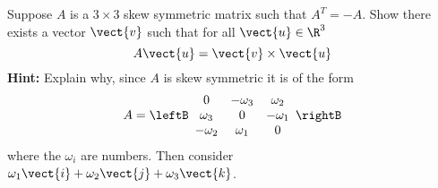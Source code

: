\begin{enumialphparenastyle}
\begin{ex} Suppose $A$ is a $3\times 3$ skew symmetric matrix such that $A^{T}=-A$. Show
there exists a vector $\vect{v}$ such that for all $\vect{u}\in
\R^{3}$
\begin{equation*}
A\vect{u}=\vect{v} \times \vect{u}
\end{equation*}
\textbf{Hint: }Explain why, since $A$ is skew symmetric it is of the form
\begin{equation*}
A=\leftB
\begin{array}{ccc}
0 & -\omega _{3} & \omega _{2} \\
\omega _{3} & 0 & -\omega _{1} \\
-\omega _{2} & \omega _{1} & 0
\end{array}
\rightB
\end{equation*}
where the $\omega _{i}$ are numbers. Then consider $\omega _{1}\vect{i}
+\omega _{2}\vect{j}+\omega _{3}\vect{k}$.
\end{ex}

\end{enumialphparenastyle}